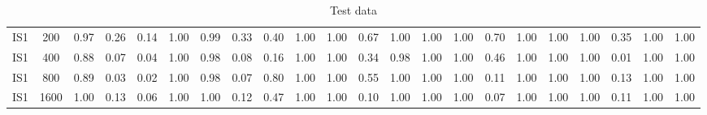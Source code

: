 \documentclass[10pt]{article}
\begin{document}
\begin{table}
\begin{tabular}{ cc||c c c c | c c c c | c c c c | c c c c| c c c c}
 					IS1 & 200 & 0.97 & 0.26 & 0.14 & 1.00 & 0.99 & 0.33 & 0.40 & 1.00& 1.00 & 0.67 & 1.00 & 1.00& 1.00 & 0.70 & 1.00 & 1.00 & 1.00 & 0.35 & 1.00 & 1.00\\ 
 					IS1 & 400 & 0.88 & 0.07 & 0.04 & 1.00 & 0.98 & 0.08 & 0.16 & 1.00& 1.00 & 0.34 & 0.98 & 1.00& 1.00 & 0.46 & 1.00 & 1.00 & 1.00 & 0.01 & 1.00 & 1.00\\ 
 					IS1 & 800 & 0.89 & 0.03 & 0.02 & 1.00 & 0.98 & 0.07 & 0.80 & 1.00& 1.00 & 0.55 & 1.00 & 1.00& 1.00 & 0.11 & 1.00 & 1.00 & 1.00 & 0.13 & 1.00 & 1.00\\ 
 					IS1 & 1600 & 1.00 & 0.13 & 0.06 & 1.00 & 1.00 & 0.12 & 0.47 & 1.00& 1.00 & 0.10 & 1.00 & 1.00& 1.00 & 0.07 & 1.00 & 1.00 & 1.00 & 0.11 & 1.00 & 1.00\\ \hline
 \hline
  \end{tabular}
  \caption{Test data}
\end{table}


\newpage
\end{document}
